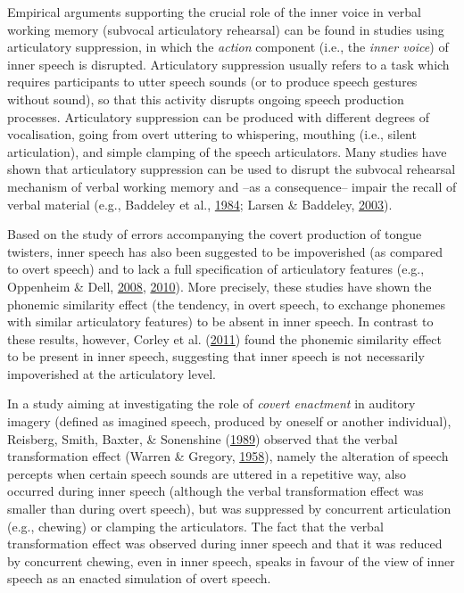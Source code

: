 \documentclass[a4paper,12pt,twoside,onecolumn,openright,final,oldfontcommands]{memoir}
\begin{document}
Empirical arguments supporting the crucial role of the inner voice in verbal working memory (subvocal articulatory rehearsal) can be found in studies using articulatory suppression, in which the \emph{action} component (i.e., the \emph{inner voice}) of inner speech is disrupted. Articulatory suppression usually refers to a task which requires participants to utter speech sounds (or to produce speech gestures without sound), so that this activity disrupts ongoing speech production processes. Articulatory suppression can be produced with different degrees of vocalisation, going from overt uttering to whispering, mouthing (i.e., silent articulation), and simple clamping of the speech articulators. Many studies have shown that articulatory suppression can be used to disrupt the subvocal rehearsal mechanism of verbal working memory and --as a consequence-- impair the recall of verbal material (e.g., Baddeley et al., \protect\hyperlink{ref-baddeley_exploring_1984}{1984}; Larsen \& Baddeley, \protect\hyperlink{ref-larsen_disruption_2003}{2003}).

Based on the study of errors accompanying the covert production of tongue twisters, inner speech has also been suggested to be impoverished (as compared to overt speech) and to lack a full specification of articulatory features (e.g., Oppenheim \& Dell, \protect\hyperlink{ref-oppenheim_inner_2008}{2008}, \protect\hyperlink{ref-oppenheim_motor_2010}{2010}). More precisely, these studies have shown the phonemic similarity effect (the tendency, in overt speech, to exchange phonemes with similar articulatory features) to be absent in inner speech. In contrast to these results, however, Corley et al. (\protect\hyperlink{ref-corley_error_2011}{2011}) found the phonemic similarity effect to be present in inner speech, suggesting that inner speech is not necessarily impoverished at the articulatory level.

In a study aiming at investigating the role of \emph{covert enactment} in auditory imagery (defined as imagined speech, produced by oneself or another individual), Reisberg, Smith, Baxter, \& Sonenshine (\protect\hyperlink{ref-reisberg_enacted_1989}{1989}) observed that the verbal transformation effect (Warren \& Gregory, \protect\hyperlink{ref-warren_auditory_1958}{1958}), namely the alteration of speech percepts when certain speech sounds are uttered in a repetitive way, also occurred during inner speech (although the verbal transformation effect was smaller than during overt speech), but was suppressed by concurrent articulation (e.g., chewing) or clamping the articulators. The fact that the verbal transformation effect was observed during inner speech and that it was reduced by concurrent chewing, even in inner speech, speaks in favour of the view of inner speech as an enacted simulation of overt speech.
\end{document}
